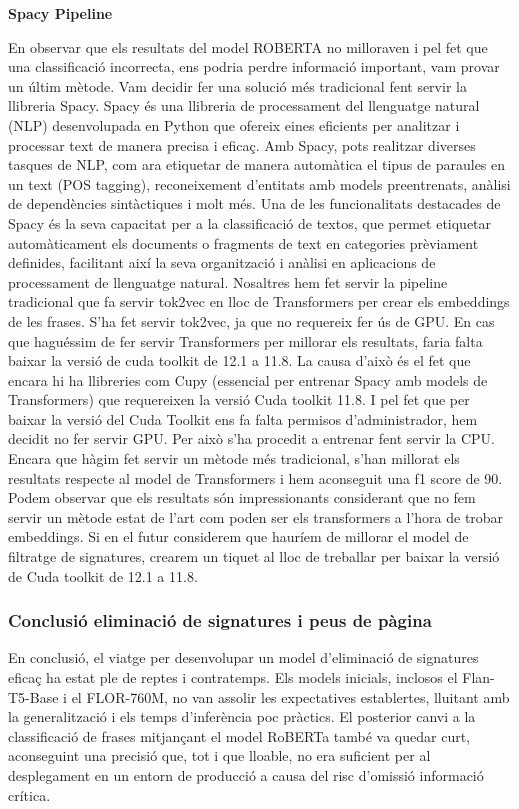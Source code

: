 \textbf{Spacy Pipeline}

En observar que els resultats del model ROBERTA no milloraven i pel fet que una classificació incorrecta, ens podria perdre informació important, vam provar un últim mètode. Vam decidir fer una solució més tradicional fent servir la llibreria Spacy.
Spacy és una llibreria de processament del llenguatge natural (NLP) desenvolupada en Python que ofereix eines eficients per analitzar i processar text de manera precisa i eficaç. Amb Spacy, pots realitzar diverses tasques de NLP, com ara etiquetar de manera automàtica el tipus de paraules en un text (POS tagging), reconeixement d'entitats amb models preentrenats, anàlisi de dependències sintàctiques i molt més. Una de les funcionalitats destacades de Spacy és la seva capacitat per a la classificació de textos, que permet etiquetar automàticament els documents o fragments de text en categories prèviament definides, facilitant així la seva organització i anàlisi en aplicacions de processament de llenguatge natural.
Nosaltres hem fet servir la pipeline tradicional que fa servir tok2vec en lloc de Transformers per crear els embeddings de les frases. S'ha fet servir tok2vec, ja que no requereix fer ús de GPU. En cas que haguéssim de fer servir Transformers per millorar els resultats, faria falta baixar la versió de cuda toolkit de 12.1 a 11.8. La causa d'això és el fet que encara hi ha llibreries com Cupy (essencial per entrenar Spacy amb models de Transformers) que requereixen la versió Cuda toolkit 11.8. I pel fet que per baixar la versió del Cuda Toolkit ens fa falta permisos d'administrador, hem decidit no fer servir GPU. Per això s'ha procedit a entrenar fent servir la CPU.
Encara que hàgim fet servir un mètode més tradicional, s'han millorat els resultats respecte al model de Transformers i hem aconseguit una f1 score de 90. Podem observar que els resultats són impressionants considerant que no fem servir un mètode estat de l'art com poden ser els transformers a l'hora de trobar embeddings. Si en el futur considerem que hauríem de millorar el model de filtratge de signatures, crearem un tiquet al lloc de treballar per baixar la versió de Cuda toolkit de 12.1 a 11.8.

\subsubsection{Conclusió eliminació de signatures i peus de pàgina}
En conclusió, el viatge per desenvolupar un model d'eliminació de signatures eficaç ha estat ple de reptes i contratemps. Els models inicials, inclosos el Flan-T5-Base i el FLOR-760M, no van assolir les expectatives establertes, lluitant amb la generalització i els temps d'inferència poc pràctics. El posterior canvi a la classificació de frases mitjançant el model RoBERTa també va quedar curt, aconseguint una precisió que, tot i que lloable, no era suficient per al desplegament en un entorn de producció a causa del risc d'omissió informació crítica.

